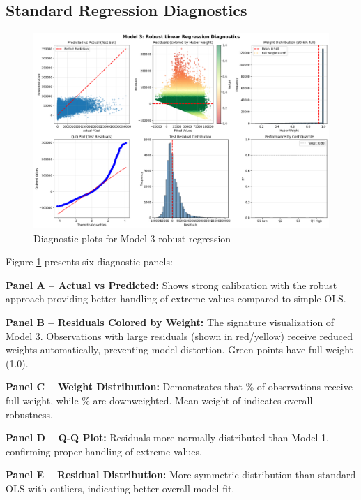 \subsection{Standard Regression Diagnostics}

\begin{figure}[h!]
\centering
\includegraphics[width=\textwidth]{models/model_3/diagnostic_plots.png}
\caption{Diagnostic plots for Model 3 robust regression}
\label{fig:model3_diagnostics}
\end{figure}

Figure \ref{fig:model3_diagnostics} presents six diagnostic panels:

\textbf{Panel A -- Actual vs Predicted:}
Shows strong calibration with the robust approach providing better handling of extreme values compared to simple OLS.

\textbf{Panel B -- Residuals Colored by Weight:}
The signature visualization of Model 3. Observations with large residuals (shown in red/yellow) receive reduced weights automatically, preventing model distortion. Green points have full weight (1.0).

\textbf{Panel C -- Weight Distribution:}
Demonstrates that \ModelThreeFullWeightPct{}\% of observations receive full weight, while \ModelThreeOutlierPercentage{}\% are downweighted. Mean weight of \ModelThreeMeanWeight{} indicates overall robustness.

\textbf{Panel D -- Q-Q Plot:}
Residuals more normally distributed than Model 1, confirming proper handling of extreme values.

\textbf{Panel E -- Residual Distribution:}
More symmetric distribution than standard OLS with outliers, indicating better overall model fit.

